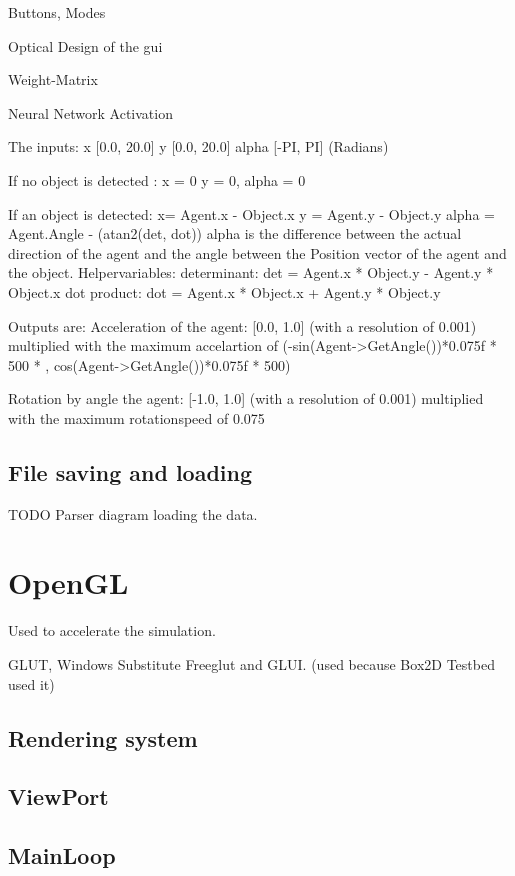\documentclass[10pt,a4paper,DIV=11]{scrreprt}
\begin{document}
Buttons, Modes

Optical Design of the gui

Weight-Matrix

Neural Network Activation


The inputs: 
x  [0.0, 20.0]
y   [0.0, 20.0]
alpha  [-PI, PI] (Radians)

If no object is detected :
x = 0
y = 0,
alpha = 0 

If an object is detected:
x= Agent.x - Object.x  
y = Agent.y - Object.y
alpha = Agent.Angle - (atan2(det, dot)) 
alpha is the difference between the actual direction of the agent and
the angle between the Position vector of the agent and the object. 
Helpervariables:
determinant: det =  Agent.x * Object.y - Agent.y * Object.x 
dot product:  dot =  Agent.x * Object.x + Agent.y * Object.y 


Outputs are:
Acceleration of the agent: [0.0, 1.0] (with a resolution of 0.001)
multiplied with the maximum accelartion of 
(-sin(Agent->GetAngle())*0.075f * 500 * ,  cos(Agent->GetAngle())*0.075f * 500)

Rotation by angle the agent: [-1.0, 1.0] (with a resolution of 0.001)
multiplied with the maximum rotationspeed of 0.075


\subsection{File saving and loading}

TODO Parser diagram loading the data.


\section{OpenGL}
Used to accelerate the simulation.


GLUT, Windows Substitute Freeglut and GLUI. (used because Box2D Testbed used it)

\subsection{Rendering system}

\subsection{ViewPort}

\subsection{MainLoop}
\end{document}
